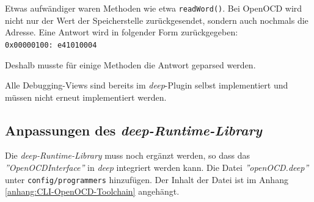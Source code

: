 Etwas aufwändiger waren Methoden wie etwa \texttt{readWord()}.
Bei OpenOCD wird nicht nur der Wert der Speicherstelle zurückgesendet, sondern auch nochmals die Adresse.
Eine Antwort wird in folgender Form zurückgegeben:\\
\texttt{0x00000100: e41010004}

Deshalb musste für einige Methoden die Antwort geparsed werden.

Alle Debugging-Views sind bereits im \textit{deep}-Plugin selbst implementiert und müssen nicht erneut implementiert werden. 



\subsection{Anpassungen des \textit{deep-Runtime-Library}}
Die \textit{deep-Runtime-Library} muss noch ergänzt werden, so dass das \textit{''OpenOCDInterface''} in \textit{deep} integriert werden kann.
Die Datei \textit{''openOCD.deep''} unter \texttt{config/programmers} hinzufügen.
Der Inhalt der Datei ist im Anhang \ref{anhang:CLI-OpenOCD-Toolchain} angehängt.


